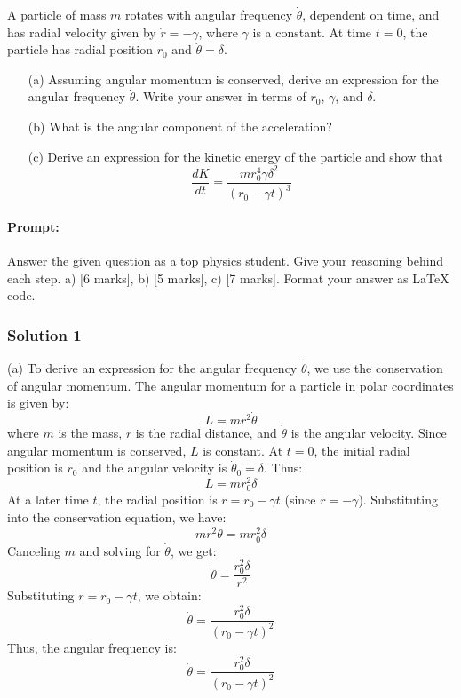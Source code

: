 \documentclass{article}
\begin{document}
A particle of mass \( m \) rotates with angular frequency \( \dot{\theta} \), dependent on time, and has radial velocity given by \( \dot{r} = -\gamma \), where \( \gamma \) is a constant. At time \( t = 0 \), the particle has radial position \( r_0 \) and \( \dot{\theta} = \delta \).

\begin{itemize}
    \item[(a)] Assuming angular momentum is conserved, derive an expression for the angular frequency \( \dot{\theta} \). Write your answer in terms of \( r_0 \), \( \gamma \), and \( \delta \).
    \item[(b)] What is the angular component of the acceleration?
    \item[(c)] Derive an expression for the kinetic energy of the particle and show that
    \[
    \frac{dK}{dt} = \frac{m r_0^4 \gamma \delta^2}{(r_0 - \gamma t)^3}
    \]
\end{itemize}

\paragraph{Prompt: \\} 
Answer the given question as a top physics student. Give your reasoning behind each step. a) [6 marks], b) [5 marks], c) [7 marks].
Format your answer as LaTeX code.

\subsubsection{Solution 1}

(a) To derive an expression for the angular frequency \( \dot{\theta} \), we use the conservation of angular momentum. The angular momentum for a particle in polar coordinates is given by:
\[
L = m r^2 \dot{\theta}
\]
where \( m \) is the mass, \( r \) is the radial distance, and \( \dot{\theta} \) is the angular velocity. Since angular momentum is conserved, \( L \) is constant. At \( t = 0 \), the initial radial position is \( r_0 \) and the angular velocity is \( \dot{\theta}_0 = \delta \). Thus:
\[
L = m r_0^2 \delta
\]
At a later time \( t \), the radial position is \( r = r_0 - \gamma t \) (since \( \dot{r} = -\gamma \)). Substituting into the conservation equation, we have:
\[
m r^2 \dot{\theta} = m r_0^2 \delta
\]
Canceling \( m \) and solving for \( \dot{\theta} \), we get:
\[
\dot{\theta} = \frac{r_0^2 \delta}{r^2}
\]
Substituting \( r = r_0 - \gamma t \), we obtain:
\[
\dot{\theta} = \frac{r_0^2 \delta}{(r_0 - \gamma t)^2}
\]
Thus, the angular frequency is:
\[
\boxed{\dot{\theta} = \frac{r_0^2 \delta}{(r_0 - \gamma t)^2}}
\]
\end{document}
